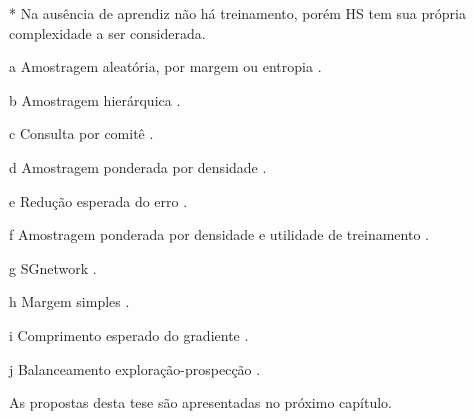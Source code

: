 \begin{quadro}
\begin{threeparttable}
\begin{tablenotes}
\item [*] Na ausência de aprendiz não há treinamento, porém HS tem sua própria complexidade a ser considerada.
\item [a] Amostragem aleatória, por margem ou entropia \cite{series/synthesis/2012Settles}.
\item [b] Amostragem hierárquica \cite{journals/tcs/Dasgupta11}.
\item [c] Consulta por comitê \cite{conf/icml/AbeM98}.
\item [d] Amostragem ponderada por densidade \cite{settles2008curious}.
\item [e] Redução esperada do erro \cite{conf/ijcai/GuoG07}.
\item [f] Amostragem ponderada por densidade e utilidade de treinamento \cite{settles2010active,journals/coling/FujiiITT98}.
\item [g] SGnetwork \cite{journals/ml/CohnAL94}.
\item [h] Margem simples \cite{journals/jmlr/TongK01}.
\item [i] Comprimento esperado do gradiente \cite{conf/nips/SettlesCR07}.
\item [j] Balanceamento exploração-prospecção \cite{conf/icdm/OsugiKS05}.
\end{tablenotes}
\end{threeparttable}
\end{quadro}

As propostas desta tese são apresentadas no próximo capítulo.